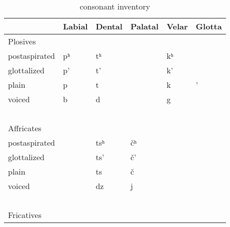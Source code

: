 \documentclass[output=paper]{LSP/langsci}
\begin{document}
\begin{table}[p]
\caption{ consonant inventory} \label{yuchiinventory}
    \begin{tabular}{llllll}\lsptoprule
    ~                           & Labial    &  Dental      &  Palatal        &  Velar      & Glotta  \\
    \midrule
     Plosives            & ~                   & ~                    & ~                       & ~                   & ~                \\
  \midrule
    postaspirated               & pʰ & tʰ  & ~                       & kʰ & ~                \\
    glottalized                 & p'                  & t'                   & ~                       & k'                  & ~                \\
    plain                       & p                   & t                    & ~                       & k                   & '                \\
    voiced                      & b                   & d                    & ~                       & g                   & ~                \\
    ~                           & ~                   & ~                    & ~                       & ~                   & ~                \\
    Affricates        & ~                   & ~                    & ~                       & ~                   & ~                \\
  \midrule
    postaspirated               & ~                   & tsʰ & \v{c}ʰ & ~                   & ~                \\
    glottalized                 & ~                   & ts'                  & \v{c}'                  & ~                   & ~                \\
    plain                       & ~                   & ts                   & \v{c}                   & ~                   & ~                \\
    voiced                      & ~                   & dz                   & j                  & ~                   & ~                \\
    ~                           & ~                   & ~                    & ~                       & ~                   & ~                \\
    Fricatives         & ~                   & ~                    & ~                       & ~                   & ~                \\

\end{tabular}
\end{table}
\end{document}
